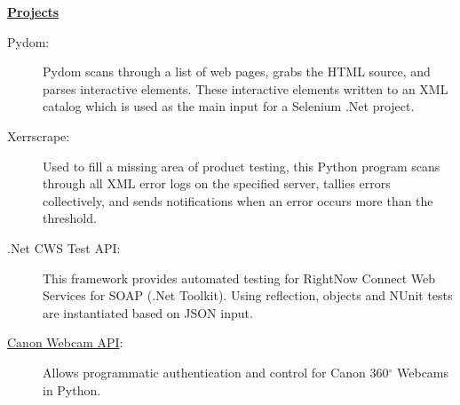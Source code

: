 \documentclass[letterpaper,11pt]{article}
\newcommand{\resheading}[1]{{\large \colorbox{mygrey}{\begin{minipage}{\textwidth}{\textbf{#1 \vphantom{p\^{E}}}}\end{minipage}}}}
\begin{document}
\begin{description}
  \end{description} %

  \resheading{\href{http://www.derekhildreth.com/portfolio.php}{Projects}}

  \begin{description}
    \item[Pydom:] { \footnotesize Pydom scans through a list of web pages, grabs the HTML source, and parses interactive elements. These interactive elements written to an XML catalog which is used as the main input for a Selenium .Net project.}

    \item[Xerrscrape:] { \footnotesize Used to fill a missing area of product testing, this Python program scans through all XML error logs on the specified server, tallies errors collectively, and sends notifications when an error occurs more than the threshold.}

    \item[.Net CWS Test API:] { \footnotesize This framework provides automated testing for RightNow Connect Web Services for SOAP (.Net Toolkit).  Using reflection, objects and NUnit tests are instantiated based on JSON input.}
    \item[\href{https://bitbucket.org/dhildreth/canon\_webview}{Canon Webcam API}:] {\footnotesize Allows programmatic authentication and control for Canon 360$^\circ$ Webcams in Python.}
  \end{description}

  
\end{document}
